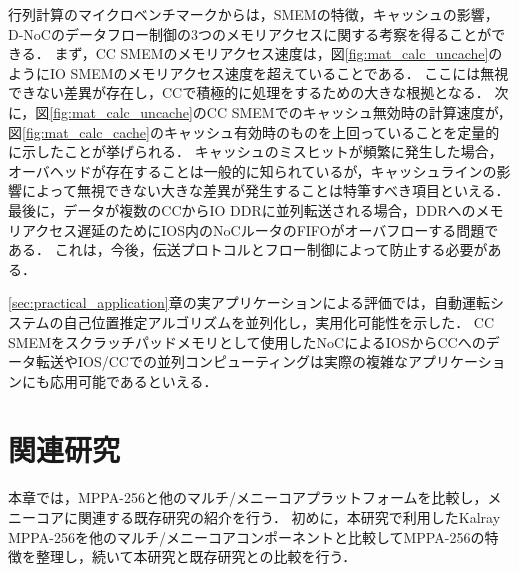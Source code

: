 \documentclass[submit,techrep]{ipsj_v2/UTF8/ipsj}
\begin{document}

行列計算のマイクロベンチマークからは，SMEMの特徴，キャッシュの影響，D-NoCのデータフロー制御の3つのメモリアクセスに関する考察を得ることができる．
まず，CC SMEMのメモリアクセス速度は，図\ref{fig:mat_calc_uncache}のようにIO SMEMのメモリアクセス速度を超えていることである．
ここには無視できない差異が存在し，CCで積極的に処理をするための大きな根拠となる．
次に，図\ref{fig:mat_calc_uncache}のCC SMEMでのキャッシュ無効時の計算速度が，図\ref{fig:mat_calc_cache}のキャッシュ有効時のものを上回っていることを定量的に示したことが挙げられる．
キャッシュのミスヒットが頻繁に発生した場合，オーバヘッドが存在することは一般的に知られているが，キャッシュラインの影響によって無視できない大きな差異が発生することは特筆すべき項目といえる．
最後に，データが複数のCCからIO DDRに並列転送される場合，DDRへのメモリアクセス遅延のためにIOS内のNoCルータのFIFOがオーバフローする問題である．
これは，今後，伝送プロトコルとフロー制御によって防止する必要がある．

\ref{sec:practical_application}章の実アプリケーションによる評価では，自動運転システムの自己位置推定アルゴリズムを並列化し，実用化可能性を示した．
CC SMEMをスクラッチパッドメモリとして使用したNoCによるIOSからCCへのデータ転送やIOS/CCでの並列コンピューティングは実際の複雑なアプリケーションにも応用可能であるといえる．

\section{関連研究}
\label{sec:related_work}
本章では，MPPA-256と他のマルチ/メニーコアプラットフォームを比較し，メニーコアに関連する既存研究の紹介を行う．
初めに，本研究で利用したKalray MPPA-256を他のマルチ/メニーコアコンポーネントと比較してMPPA-256の特徴を整理し，続いて本研究と既存研究との比較を行う．
\end{document}
